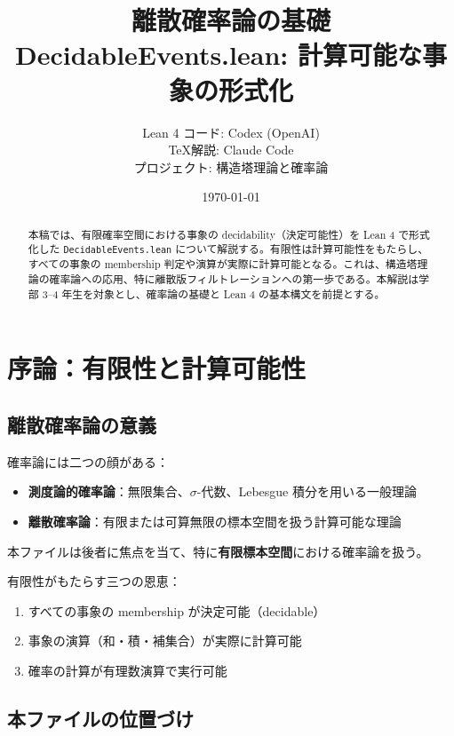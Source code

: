 \documentclass[12pt,a4paper,ja=standard]{bxjsarticle}
\title{\Huge\bfseries 離散確率論の基礎\\
\Large DecidableEvents.lean: 計算可能な事象の形式化}
\author{
    \large Lean 4 コード: Codex (OpenAI) \\
    \large \TeX 解説: Claude Code \\
    \vspace{0.3cm}
    \normalsize プロジェクト: 構造塔理論と確率論
}
\date{\today}
\theoremstyle{definition}
\begin{document}
\maketitle

\begin{abstract}
本稿では、有限確率空間における事象の decidability（決定可能性）を Lean 4 で形式化した \texttt{DecidableEvents.lean} について解説する。有限性は計算可能性をもたらし、すべての事象の membership 判定や演算が実際に計算可能となる。これは、構造塔理論の確率論への応用、特に離散版フィルトレーションへの第一歩である。本解説は学部 3--4 年生を対象とし、確率論の基礎と Lean 4 の基本構文を前提とする。
\end{abstract}

\tableofcontents
\newpage

\section{序論：有限性と計算可能性}

\subsection{離散確率論の意義}

確率論には二つの顔がある：

\begin{itemize}
    \item \textbf{測度論的確率論}：無限集合、$\sigma$-代数、Lebesgue 積分を用いる一般理論
    \item \textbf{離散確率論}：有限または可算無限の標本空間を扱う計算可能な理論
\end{itemize}

本ファイルは後者に焦点を当て、特に\textbf{有限標本空間}における確率論を扱う。

\begin{keypoint}
有限性がもたらす三つの恩恵：
\begin{enumerate}
    \item すべての事象の membership が決定可能（decidable）
    \item 事象の演算（和・積・補集合）が実際に計算可能
    \item 確率の計算が有理数演算で実行可能
\end{enumerate}
\end{keypoint}

\subsection{本ファイルの位置づけ}
\end{document}
